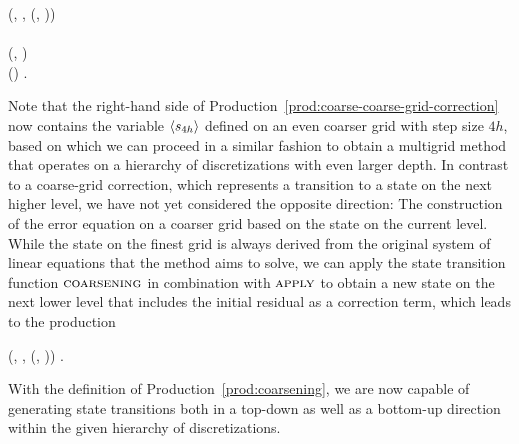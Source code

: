 \begin{production}
	 {
		(\bnfts{$\omega$}, \bnfsp {}, \bnfsp {}(, \bnfsp {})) \bnfor
	} \\
	\label{prod:coarse-coarse-grid-correction} \\
	 {
		(, \bnfsp {})
	} \\
	 {
		() \bnfsp {} \bnfsp {}.
	}
\end{production}
Note that the right-hand side of Production~\eqref{prod:coarse-coarse-grid-correction} now contains the variable $\langle s_{4h} \rangle$ defined on an even coarser grid with step size $4h$, based on which we can proceed in a similar fashion to obtain a multigrid method that operates on a hierarchy of discretizations with even larger depth.
In contrast to a coarse-grid correction, which represents a transition to a state on the next higher level, we have not yet considered the opposite direction: The construction of the error equation on a coarser grid based on the state on the current level.
While the state on the finest grid is always derived from the original system of linear equations that the method aims to solve, we can apply the state transition function $\textsc{coarsening}$ in combination with $\textsc{apply}$ to obtain a new state on the next lower level that includes the initial residual as a correction term, which leads to the production
\begin{production}
 {
	(, \bnfsp {}, \bnfsp {}(, \bnfsp {}))
}.
\label{prod:coarsening}
\end{production}
With the definition of Production~\eqref{prod:coarsening}, we are now capable of generating state transitions both in a top-down as well as a bottom-up direction within the given hierarchy of discretizations.
